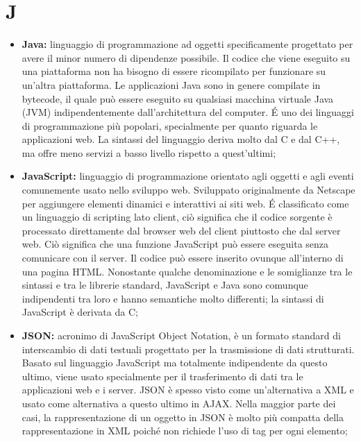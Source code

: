 \section*{\Huge J} %
\label{sec:j}
	\begin{itemize}
		\item \textbf{Java:} linguaggio di programmazione ad oggetti specificamente progettato per avere il minor numero di dipendenze possibile. Il codice che viene eseguito su una piattaforma non ha bisogno di essere ricompilato per funzionare su un'altra piattaforma. Le applicazioni Java sono in genere compilate in bytecode, il quale può essere eseguito su qualsiasi macchina virtuale Java (JVM) indipendentemente dall'architettura del computer. É uno dei linguaggi di programmazione più popolari, specialmente per quanto riguarda le applicazioni web. La sintassi del linguaggio deriva molto dal C e dal C++, ma offre meno servizi a basso livello rispetto a quest'ultimi;
		\item \textbf{JavaScript:} linguaggio di programmazione orientato agli oggetti e agli eventi comunemente usato nello sviluppo web. Sviluppato originalmente da Netscape per aggiungere elementi dinamici e interattivi ai siti web. É classificato come un linguaggio di scripting lato client, ciò significa che il codice sorgente è processato direttamente dal browser web del client piuttosto che dal server web. Ciò significa che una funzione JavaScript può essere eseguita senza comunicare con il server. Il codice può essere inserito ovunque all'interno di una pagina HTML. Nonostante qualche denominazione e le somiglianze tra le sintassi e tra le librerie standard, JavaScript e Java sono comunque indipendenti tra loro e hanno semantiche molto differenti; la sintassi di JavaScript è derivata da C;
		\item \textbf{JSON:} acronimo di JavaScript Object Notation, è un formato standard di interscambio di dati testuali progettato per la trasmissione di dati strutturati. Basato sul linguaggio JavaScript ma totalmente indipendente da questo ultimo, viene usato specialmente per il trasferimento di dati tra le applicazioni web e i server. JSON è spesso visto come un'alternativa a XML e usato come alternativa a questo ultimo in AJAX. Nella maggior parte dei casi, la rappresentazione di un oggetto in JSON è molto più compatta della rappresentazione in XML poiché non richiede l'uso di tag per ogni elemento;
	\end{itemize}
\pagebreak
